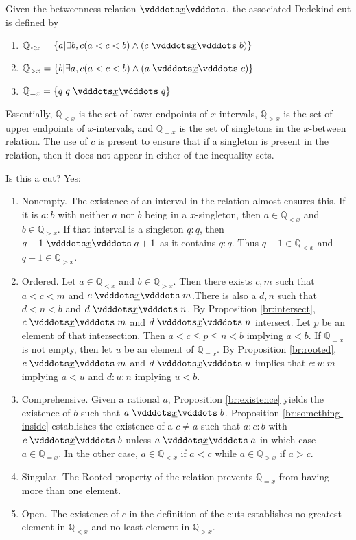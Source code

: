 \documentclass[12pt]{article}
\newcommand{\qcut}[2][x]{\ensuremath{\mathbb{Q}_{#2 #1}}}
\newcommand{\qlt}[1][x]{\qcut[#1]{<}}
\newcommand{\qeq}[1][x]{\qcut[#1]{=}}
\newcommand{\qgt}[1][x]{\qcut[#1]{>}}
\begin{document}
Given the betweenness relation $\xrel$, the associated Dedekind cut is defined by \begin{enumerate}
    \item $\qlt = \{ a | \exists b, c (a < c < b) \wedge (c \xrel b) \} $
    \item $\qgt = \{ b | \exists a, c (a < c < b) \wedge (a \xrel c) \} $
    \item $\qeq = \{ q | q \xrel q \} $
\end{enumerate}
Essentially, $\qlt$ is the set of lower endpoints of $x$-intervals, $\mathbb{Q}_{>x}$ is the set of upper endpoints of $x$-intervals, and $\qeq$ is the set of singletons in the $x$-between relation. The use of $c$ is present to ensure that if a singleton is present in the relation, then it does not appear in either of the inequality sets. 

Is this a cut? Yes: 
\begin{enumerate}
    \item Nonempty. The existence of an interval in the relation almost ensures this. If it is $a:b$ with neither $a$ nor $b$ being in a $x$-singleton, then $a \in \qlt$ and $b \in \qgt$. If that interval is a singleton $q:q$, then $q-1 \xrel q+1$ as it contains $q:q$. Thus  $q-1 \in \qlt$ and $q+1 \in \qgt$.
    \item Ordered. Let $a \in \qlt$ and $b \in \qgt$.  Then there exists $c, m$ such that $a < c < m$ and $c \xrel m$.There is also a $d, n$ such that $d < n< b$  and $d \xrel n$. By Proposition \ref{br:intersect}, $c \xrel m$ and $d \xrel n$ intersect. Let $p$ be an element of that intersection. Then $a < c \leq p \leq n < b$ implying $a < b$.  If $\qeq$ is not empty, then let $u$ be an element of $\qeq$. By Proposition \ref{br:rooted}, $c \xrel m$ and $d \xrel n$ implies that $c:u:m$ implying $a < u$ and $d:u:n$ implying $u < b$. 
    \item Comprehensive. Given a rational $a$, Proposition \ref{br:existence} yields the existence of $b$ such that $a \xrel b$. Proposition \ref{br:something-inside} establishes the existence of a $c \neq a$ such that $a:c:b$ with $c \xrel b$ unless $a \xrel a$ in which case $a \in \qeq$. In the other case, $a \in \qlt$ if $a < c$ while $a  \in \qgt$ if $a > c$. 
    \item Singular. The Rooted property of the relation prevents $\qeq$ from having more than one element. 
    \item Open. The existence of $c$ in the definition of the cuts establishes no greatest element in $\qlt$ and no least element in $\qgt$. 
\end{enumerate}
\end{document}
